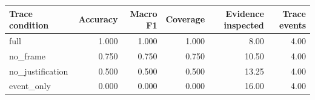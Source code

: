 \begin{tabular}{lrrrrr}
\toprule
Trace condition & Accuracy & Macro F1 & Coverage & Evidence inspected & Trace events \\
\midrule
full & 1.000 & 1.000 & 1.000 & 8.00 & 4.00 \\
no\_frame & 0.750 & 0.750 & 0.750 & 10.50 & 4.00 \\
no\_justification & 0.500 & 0.500 & 0.500 & 13.25 & 4.00 \\
event\_only & 0.000 & 0.000 & 0.000 & 16.00 & 4.00 \\
\bottomrule
\end{tabular}
